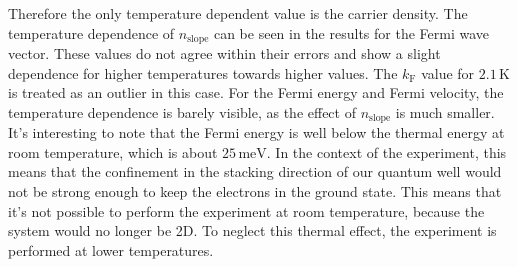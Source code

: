 Therefore the only temperature dependent value is the carrier density. The temperature dependence of $n_\text{slope}$ can be seen in the results for the Fermi wave vector. These values do not agree within their errors and show a slight dependence for higher temperatures towards higher values. The $k_\text{F}$ value for $2.1\,\text{K}$ is treated as an outlier in this case. For the Fermi energy and Fermi velocity, the temperature dependence is barely visible, as the effect of $n_\text{slope}$ is much smaller. \\ It's interesting to note that the Fermi energy is well below the thermal energy at room temperature, which is about $25\,\text{meV}$. In the context of the experiment, this means that the confinement in the stacking direction of our quantum well would not be strong enough to keep the electrons in the ground state. This means that it's not possible to perform the experiment at room temperature, because the system would no longer be 2D.
To neglect this thermal effect, the experiment is performed at lower temperatures.